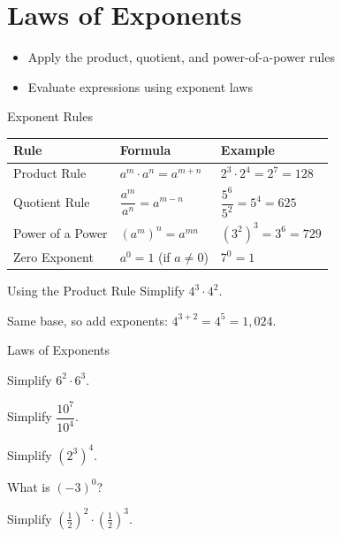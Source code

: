 \section{Laws of Exponents}

\begin{learningGoals}
\begin{itemize}
    \item Apply the product, quotient, and power-of-a-power rules
    \item Evaluate expressions using exponent laws
\end{itemize}
\end{learningGoals}

\begin{conceptBox}{Exponent Rules}
\begin{center}
\begin{tabular}{l l l}
    \textbf{Rule} & \textbf{Formula} & \textbf{Example} \\
    \hline
    Product Rule & $a^m \cdot a^n = a^{m+n}$ & $2^3 \cdot 2^4 = 2^7 = 128$ \\
    Quotient Rule & $\dfrac{a^m}{a^n} = a^{m-n}$ & $\dfrac{5^6}{5^2} = 5^4 = 625$ \\
    Power of a Power & $(a^m)^n = a^{mn}$ & $(3^2)^3 = 3^6 = 729$ \\
    Zero Exponent & $a^0 = 1$ \;(if $a \neq 0$) & $7^0 = 1$ \\
\end{tabular}
\end{center}
\end{conceptBox}

\begin{workedExample}{Using the Product Rule}
Simplify $4^3 \cdot 4^2$.

Same base, so add exponents: $4^{3+2} = 4^5 = 1{,}024$.
\end{workedExample}


\begin{practiceBox}{Laws of Exponents}
\resetProblems

\prob Simplify $6^2 \cdot 6^3$.

\prob Simplify $\dfrac{10^7}{10^4}$.

\prob Simplify $(2^3)^4$.

\prob What is $(-3)^0$?

\prob Simplify $\left(\frac{1}{2}\right)^2 \cdot \left(\frac{1}{2}\right)^3$.

\end{practiceBox}
